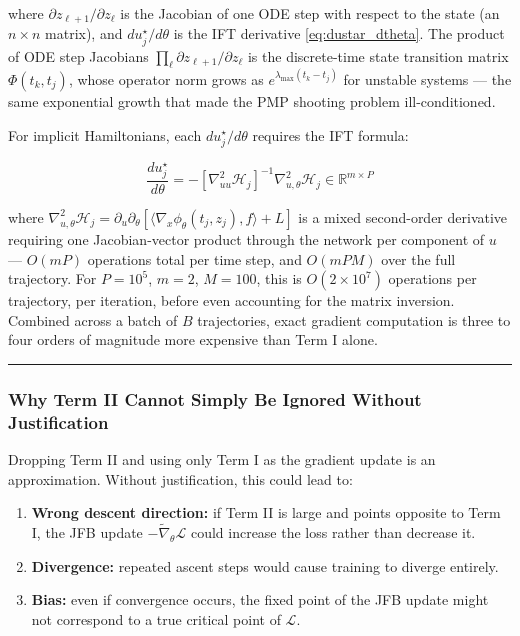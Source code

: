 \documentclass{article}
\begin{document}
where $\partial z_{\ell+1}/\partial z_\ell$ is the Jacobian of one ODE step
with respect to the state (an $n \times n$ matrix), and
$du_j^\star/d\theta$ is the IFT derivative \eqref{eq:dustar_dtheta}. The
product of ODE step Jacobians $\prod_\ell \partial z_{\ell+1}/\partial z_\ell$
is the discrete-time state transition matrix $\Phi(t_k, t_j)$, whose operator
norm grows as $e^{\lambda_{\max}(t_k - t_j)}$ for unstable systems --- the
same exponential growth that made the PMP shooting problem ill-conditioned.

For implicit Hamiltonians, each $du_j^\star/d\theta$ requires the IFT formula:

\begin{equation}
    \frac{du_j^\star}{d\theta}
    = -\left[\nabla^2_{uu}\mathcal{H}_j\right]^{-1}
    \nabla_{u,\theta}^2\mathcal{H}_j
    \in \mathbb{R}^{m \times P}
\end{equation}

where $\nabla_{u,\theta}^2\mathcal{H}_j = \partial_u\partial_\theta
[\langle\nabla_x\phi_\theta(t_j,z_j), f\rangle + L]$ is a mixed
second-order derivative requiring one Jacobian-vector product through the
network per component of $u$ --- $O(mP)$ operations total per time step,
and $O(mPM)$ over the full trajectory. For $P = 10^5$, $m = 2$, $M = 100$,
this is $O(2 \times 10^7)$ operations per trajectory, per iteration, before
even accounting for the matrix inversion. Combined across a batch of $B$
trajectories, exact gradient computation is three to four orders of magnitude
more expensive than Term I alone.

\medskip\hrule\medskip

\subsubsection{Why Term II Cannot Simply Be Ignored Without Justification}

Dropping Term II and using only Term I as the gradient update is an
approximation. Without justification, this could lead to:

\begin{enumerate}
    \item \textbf{Wrong descent direction:} if Term II is large and points
          opposite to Term I, the JFB update $-\widetilde{\nabla}_\theta
          \mathcal{L}$ could increase the loss rather than decrease it.
    \item \textbf{Divergence:} repeated ascent steps would cause training
          to diverge entirely.
    \item \textbf{Bias:} even if convergence occurs, the fixed point of
          the JFB update might not correspond to a true critical point of
          $\mathcal{L}$.
\end{enumerate}
\end{document}
